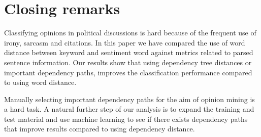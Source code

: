 \documentclass[11pt]{article}
\begin{document}
\section{Closing remarks}
\label{sec:cr}

Classifying opinions in political discussions is hard because of the frequent use of irony, sarcasm and citations. In this paper we have compared the use of word distance between keyword and sentiment word against metrics related to parsed sentence information. Our results show that using dependency tree distances or important dependency paths, improves the classification performance compared to using word distance. 

Manually selecting important dependency paths for the aim of opinion mining is a hard task. A natural further step of our analysis is to expand the training and test material and use machine learning to see if there exists dependency paths that improve results compared to using dependency distance.


\end{document}
